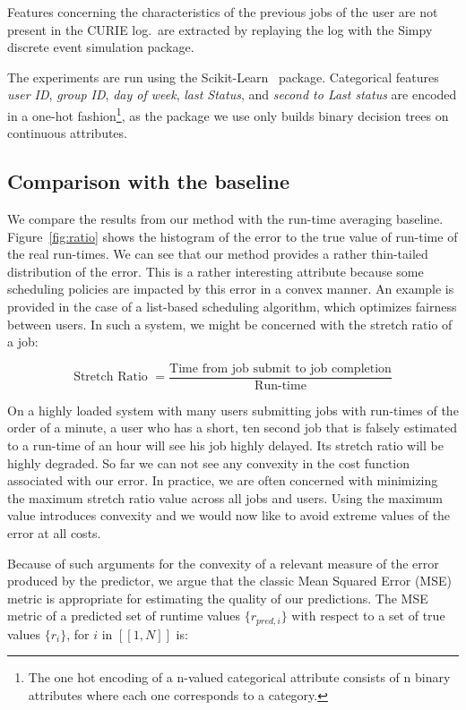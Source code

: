 \documentclass{article}
\begin{document}
  Features concerning the characteristics of the previous jobs of the user are not present in the CURIE log.\ are extracted by replaying the log with the Simpy~\cite{simpy} discrete event simulation package.

  The experiments are run using the Scikit-Learn~\cite{scikit-learn} package. Categorical features \textit{user ID}, \textit{group ID}, \textit{day of week}, \textit{last Status}, and \textit{second to Last status} are encoded in a one-hot fashion\footnote{The one hot encoding of a n-valued categorical attribute consists of n binary attributes where each one corresponds to a category.}, as the package we use only builds binary decision trees on continuous attributes.

  \subsection{Comparison with the baseline}
  \label{sub:comparison_with_average_baseline}
  We compare the results from our method with the run-time averaging baseline.
  Figure~\ref{fig:ratio} shows the histogram of the error to the true value of run-time of the real run-times.
  We can see that our method provides a rather thin-tailed distribution of the error.
  This is a rather interesting attribute because some scheduling policies are impacted by this error in a convex manner.
  An example is provided in the case of a list-based scheduling algorithm, which optimizes fairness between users. In such a system, we might be concerned with the stretch ratio of a job:

  \[
    \mbox{Stretch Ratio } = \frac{\mbox{Time from job submit to job completion}}{\mbox{Run-time}}
  \]

  On a highly loaded system with many users submitting jobs with run-times of the order of a minute, a user who has a short, ten second job that is falsely estimated to a run-time of an hour will see his job highly delayed. Its stretch ratio will be highly degraded.
  So far we can not see any convexity in the cost function associated with our error. In practice, we are often concerned with minimizing the maximum stretch ratio value across all jobs and users. Using the maximum value introduces convexity and we would now like to avoid extreme values of the error at all costs.

  Because of such arguments for the convexity of a relevant measure of the error produced by the predictor, we argue that the classic Mean Squared Error (MSE) metric is appropriate for estimating the quality of our predictions. The MSE metric of a predicted set of runtime values $\{r_{pred,i}\}$ with respect to a set of true values $\{r_{i}\}$, for $i$ in $[\![ 1,N]\!]$ is:
\end{document}
